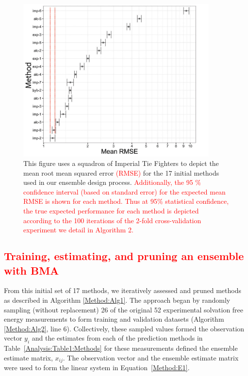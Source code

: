 \documentclass[journal=jpcbfk, manuscript=article]{achemso}
\newcommand{\+}[1]{\ensuremath{\mathbf{#1}}}
\newcommand{\rev}[1]{\textsf{\textcolor{red}{#1}}}
\begin{document}
\begin{figure}[h!]
	\centering
	\includegraphics[keepaspectratio,width=0.9\textwidth]{Figures/Rev2/RMSE_SE}
	\caption{
	This figure uses a squadron of Imperial Tie Fighters to depict the mean root mean squared error \rev{(RMSE)} for the 17 initial methods used in our ensemble design process.
	\rev{Additionally, the 95 \% confidence interval (based on standard error) for the expected mean RMSE is shown for each method.
	Thus at 95\% statistical confidence, the true expected performance for each method is depicted according to the 100 iterations of the 2-fold cross-validation experiment we detail in Algorithm 2.}}
	\label{Analysis:Figure1:Methods}
\end{figure}
 
 \subsection{\rev{Training, estimating, and pruning an ensemble with BMA}} \label{EP:training}
From this initial set of 17 methods, we iteratively assessed and pruned methods as described in Algorithm \ref{Method:Alg1}.
The approach began by randomly sampling (without replacement) 26 of the original 52 experimental solvation free energy measurements to form training and validation datasets (Algorithm \ref{Method:Alg2}, line 6).
Collectively, these sampled values formed the observation vector $y_i$ and the estimates from each of the prediction methods in Table~\ref{Analysis:Table1:Methods} for these measurements defined the ensemble estimate matrix, $x_{i j}$.
The observation vector and the ensemble estimate matrix were used to form the linear system in Equation~\ref{Method:E1}.  
\end{document}
